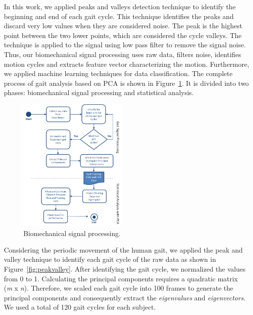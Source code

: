 \documentclass[10pt, conference, compsocconf]{IEEEtran}
\begin{document}
In this work, we applied peaks and valleys detection technique to identify the beginning and end of each gait cycle. This technique identifies the peaks and discard very low values when they are considered noise. The peak is the highest point between the two lower points, which are considered the cycle valleys. The technique is applied to the signal using low pass filter to remove the signal noise. Thus, our biomechanical signal processing uses raw data, filters noise, identifies motion cycles and extracts feature vector characterizing the motion. Furthermore, we applied machine learning techniques for data classification. The complete process of gait analysis based on PCA is shown in Figure~\ref{fig:biomecproc}. It is divided into two phases: biomechanical signal processing and statistical analysis. 

\begin{figure}[!htb]
	\centering
	\includegraphics[width=0.475\textwidth]{img/biomecanicalsignal.png}
	\caption{Biomechanical signal processing.}
	\label{fig:biomecproc}
\end{figure}



Considering the periodic movement of the human gait, we applied the peak and valley technique to identify each gait cycle of the raw data as shown in Figure~\ref{fig:peakvalley}. After identifying the gait cycle, we normalized the values from 0 to 1. Calculating the principal components requires a quadratic matrix~\cite{Shlens05atutorial} (\textit{m} x \textit{n}). Therefore, we scaled each gait cycle into 100 frames to generate the principal components and consequently extract the \textit{eigenvalues} and \textit{eigenvectors}. We used a total of 120 gait cycles for each subject.
\end{document}
